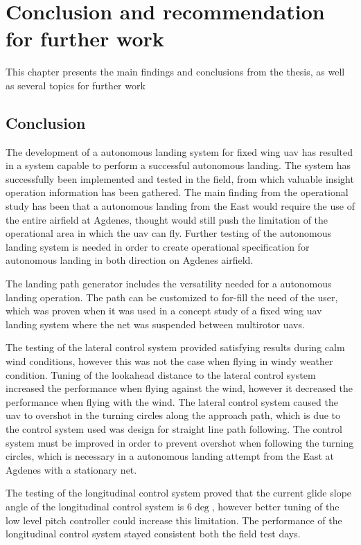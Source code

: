\chapter{Conclusion and recommendation for further work}
This chapter presents the main findings and conclusions from the thesis, as well as several topics for further work
\section{Conclusion}
The development of a autonomous landing system for fixed wing \gls{uav} has resulted in a system capable to perform a successful autonomous landing. The system has successfully been implemented and tested in the field, from which valuable insight operation information has been gathered. The main finding from the operational study has been that a autonomous landing from the East would require the use of the entire airfield at Agdenes, thought would still push the limitation of the operational area in which the \gls{uav} can fly. Further testing of the autonomous landing system is needed in order to create operational specification for autonomous landing in both direction on Agdenes airfield. 

The landing path generator includes the versatility needed for a autonomous landing operation. The path can be customized to for-fill the need of the user, which was proven when it was used in a concept study of a  fixed wing \gls{uav} landing system where the net was suspended between multirotor \glspl{uav}.

The testing of the lateral control system provided satisfying results during calm wind conditions, however this was not the case when flying in windy weather condition. Tuning of the lookahead distance to the lateral control system increased the performance when flying against the wind, however it decreased the performance when flying with the wind. The lateral control system caused the \gls{uav} to overshot in the turning circles along the approach path, which is due to the control system used was design for straight line path following. The control system must be improved in order to prevent overshot when following the turning circles, which is necessary in a autonomous landing attempt from the East at Agdenes with a stationary net.

The testing of the longitudinal control system proved that the current glide slope angle of the longitudinal control system is $6 \deg$, however better tuning of the low level pitch controller could increase this limitation. The performance of the longitudinal control system stayed consistent both the field test days.

